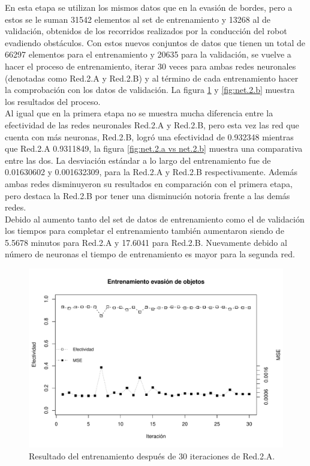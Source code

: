 \documentclass{iccmemoria}
\begin{document}
En esta etapa se utilizan los mismos datos que en la evasión de bordes, pero a estos se le suman 31542 elementos al set de entrenamiento y 13268 al de validación, obtenidos de los recorridos realizados por la conducción del robot evadiendo obstáculos. Con estos nuevos conjuntos de datos que tienen un total de 66297 elementos para el entrenamiento y 20635 para la validación, se vuelve a hacer el proceso de entrenamiento, iterar 30 veces para ambas redes neuronales (denotadas como Red.2.A y Red.2.B) y al término de cada entrenamiento hacer la comprobación con los datos de validación. La figura \ref{fig:net.2.a} y \ref{fig:net.2.b} muestra los resultados del proceso.\\

Al igual que en la primera etapa no se muestra mucha diferencia entre la efectividad de las redes neuronales Red.2.A y Red.2.B, pero esta vez las red que cuenta con más neuronas, Red.2.B, logró una efectividad de 0.932348 mientras que Red.2.A 0.9311849, la figura \ref{fig:net.2.a vs net.2.b} muestra una comparativa entre las dos. La desviación estándar a lo largo del entrenamiento fue de 0.01630602 y 0.001632309, para la Red.2.A y Red.2.B respectivamente. Además ambas redes disminuyeron su resultados en comparación con el primera etapa, pero destaca la Red.2.B por tener una disminución notoria frente a las demás redes.\\

Debido al aumento tanto del set de datos de entrenamiento como el de validación los tiempos para completar el entrenamiento también aumentaron siendo de 5.5678 minutos para Red.2.A y 17.6041 para Red.2.B. Nuevamente debido al número de neuronas el tiempo de entrenamiento es mayor para la segunda red.\\

\begin{figure}
  \centering
  \includegraphics[width = 450pt]{images/plot_net_2_a.pdf}
  \caption[Entrenamiento segunda etapa Red.2.A.]{Resultado del entrenamiento después de 30 iteraciones de Red.2.A.}
  \label{fig:net.2.a}
\end{figure}
\end{document}

